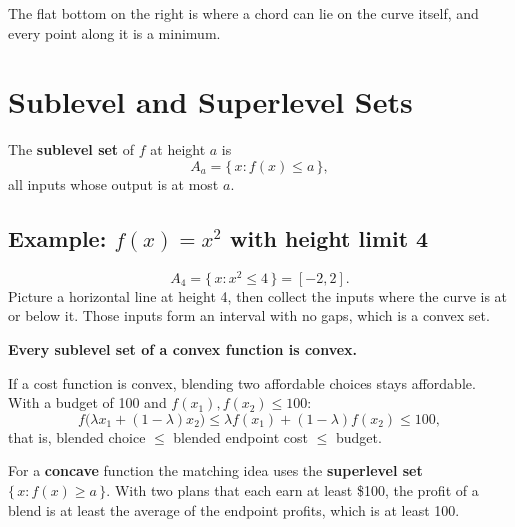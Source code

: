 \documentclass[11pt]{article}
\begin{document}
\begin{center}
\end{center}

The flat bottom on the right is where a chord can lie on the curve itself, and
every point along it is a minimum.

\section{Sublevel and Superlevel Sets}

The \textbf{sublevel set} of $f$ at height $a$ is
\[
    A_a = \{\, x : f(x) \le a \,\},
\]
all inputs whose output is at most $a$.

\subsection*{Example: $f(x) = x^2$ with height limit 4}

\[
    A_4 = \{\, x : x^2 \le 4 \,\} = [-2, 2].
\]
Picture a horizontal line at height 4, then collect the inputs where the curve is
at or below it. Those inputs form an interval with no gaps, which is a convex set.

\textbf{Every sublevel set of a convex function is convex.}

If a cost function is convex, blending two affordable choices stays affordable.
With a budget of 100 and $f(x_1), f(x_2) \le 100$:
\[
    f\big(\lambda x_1 + (1-\lambda) x_2\big) \le \lambda f(x_1) + (1-\lambda) f(x_2) \le 100,
\]
that is, blended choice $\le$ blended endpoint cost $\le$ budget.

For a \textbf{concave} function the matching idea uses the \textbf{superlevel set}
$\{\, x : f(x) \ge a \,\}$. With two plans that each earn at least \$100, the profit
of a blend is at least the average of the endpoint profits, which is at least 100.
\end{document}
